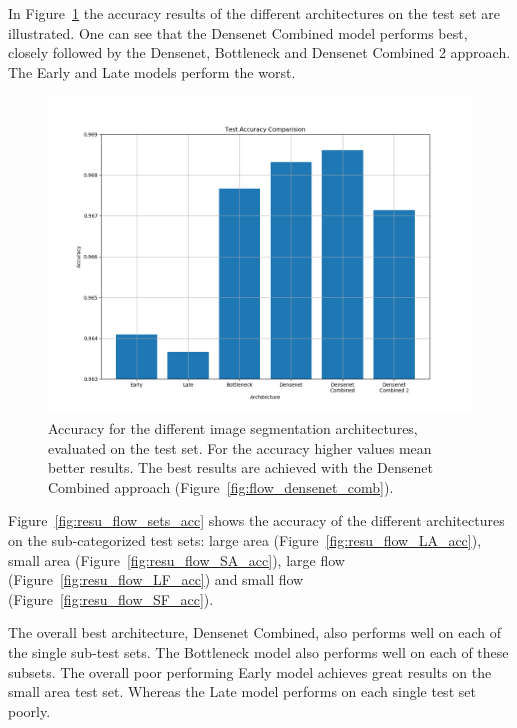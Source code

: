 In Figure~\ref{fig:resu_flow_test_acc} the accuracy results of the different architectures on the test set are illustrated. One can see that the Densenet Combined model performs best, closely followed by the Densenet, Bottleneck and Densenet Combined 2 approach. The Early and Late models perform the worst. 

\begin{figure}[H]
	\centering
	\includegraphics[width=.6\linewidth]{results_flow/Test_Accuracy_Comparision.png}
	\caption[figure]{Accuracy for the different image segmentation architectures, evaluated on the test set. For the accuracy higher values mean better results. The best results are achieved with the Densenet Combined approach (Figure~\ref{fig:flow_densenet_comb}).}
	\label{fig:resu_flow_test_acc}
\end{figure}


Figure~\ref{fig:resu_flow_sets_acc} shows the accuracy of the different architectures on the sub-categorized test sets: large area (Figure~\ref{fig:resu_flow_LA_acc}), small area (Figure~\ref{fig:resu_flow_SA_acc}), large flow (Figure~\ref{fig:resu_flow_LF_acc}) and small flow (Figure~\ref{fig:resu_flow_SF_acc}).

The overall best architecture, Densenet Combined, also performs well on each of the single sub-test sets. The Bottleneck model also performs well on each of these subsets. The overall poor performing Early model achieves great results on the small area test set. Whereas the Late model performs on each single test set poorly.

